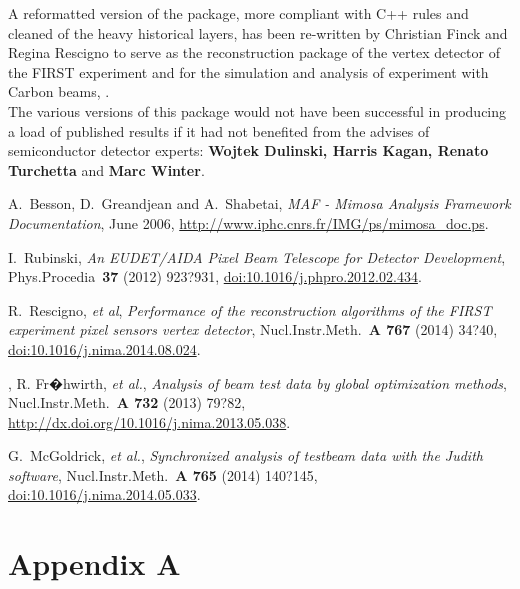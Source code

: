 \documentclass[a4paper, 12pt, twoside]{article}
\begin{document}
A reformatted version of the package, more compliant with C++ rules and cleaned of the heavy historical layers, has been re-written by Christian Finck and Regina Rescigno to serve as the reconstruction package of the vertex detector of the FIRST experiment and for the simulation and analysis of experiment with Carbon beams, \cite{}.\\

The various versions of this package would not have been successful in producing a load of published results if it had not benefited from the advises of semiconductor detector experts: {\bf Wojtek Dulinski, Harris Kagan, Renato Turchetta} and {\bf Marc Winter}.

\newpage

\begin{thebibliography}{99}

  A.~Besson, D.~Greandjean and A.~Shabetai, \emph{MAF - Mimosa Analysis Framework Documentation}, June 2006, \url{http://www.iphc.cnrs.fr/IMG/ps/mimosa_doc.ps}.

 I.~Rubinski, \emph{An EUDET/AIDA Pixel Beam Telescope for Detector Development}, Phys.Procedia~{\bf 37} (2012) 923?931, \href{http://dx.doi.org/10.1016/j.phpro.2012.02.434}{doi:10.1016/j.phpro.2012.02.434}.

  R.~Rescigno, {\it et al}, \emph{Performance of the reconstruction algorithms of the FIRST experiment pixel sensors vertex detector}, Nucl.Instr.Meth.~{\bf A 767} (2014) 34?40, \href{http://dx.doi.org/10.1016/j.nima.2014.08.024}{doi:10.1016/j.nima.2014.08.024}.

, R. Fr�hwirth, {\it et al.}, \emph{Analysis of beam test data by global optimization methods}, Nucl.Instr.Meth.~{\bf A 732} (2013) 79?82, \href{http://dx.doi.org/10.1016/j.nima.2013.05.038}{http://dx.doi.org/10.1016/j.nima.2013.05.038}.

 G.~McGoldrick, {\it et al.}, \emph{Synchronized analysis of testbeam data with the Judith software}, Nucl.Instr.Meth.~{\bf A 765} (2014) 140?145, \href{http://dx.doi.org/10.1016/j.nima.2014.05.033}{doi:10.1016/j.nima.2014.05.033}.

\end{thebibliography}

\newpage

\section*{Appendix A}
\label{appConfiguration}
\end{document}
